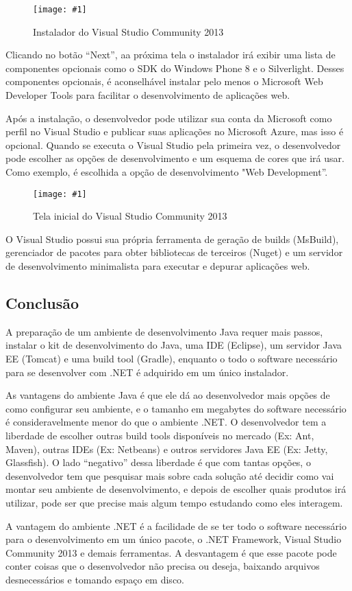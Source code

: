 \documentclass[a4paper,12pt]{article}
\newcommand{\figura}[2] {
	\begin{figure}[ht]
		\centering
		\texttt{[image: \#1]}
		\caption{#2}
	\end{figure}
	\FloatBarrier
}
\begin{document}
\figura{vs1.png}{Instalador do Visual Studio Community 2013}

Clicando no botão “Next”, aa próxima tela o instalador irá exibir uma lista de componentes opcionais como o SDK do Windows Phone 8 e o Silverlight. Desses componentes opcionais, é aconselhável instalar pelo menos o Microsoft Web Developer Tools para facilitar o desenvolvimento de aplicações web.

Após a instalação, o desenvolvedor pode utilizar sua conta da Microsoft como perfil no Visual Studio e publicar suas aplicações no Microsoft Azure, mas isso é opcional. Quando se executa o Visual Studio pela primeira vez, o desenvolvedor pode escolher as opções de desenvolvimento e um esquema de cores que irá usar. Como exemplo, é escolhida a opção de desenvolvimento "Web Development”.

\figura{vs2.png}{Tela inicial do Visual Studio Community 2013}

O Visual Studio possui sua própria ferramenta de geração de builds (MsBuild), gerenciador de pacotes para obter bibliotecas de terceiros (Nuget) e um servidor de desenvolvimento minimalista para executar e depurar aplicações web. 

\subsection{Conclusão}

A preparação de um ambiente de desenvolvimento Java requer mais passos, instalar o kit de desenvolvimento do Java, uma IDE (Eclipse), um servidor Java EE (Tomcat) e uma build tool (Gradle), enquanto o todo o software necessário para se desenvolver com .NET é adquirido em um único instalador.

As vantagens do ambiente Java é que ele dá ao desenvolvedor mais opções de como configurar seu ambiente, e o tamanho em megabytes do software necessário é consideravelmente menor do que o ambiente .NET. O desenvolvedor tem a liberdade de escolher outras build tools disponíveis no mercado (Ex: Ant, Maven), outras IDEs (Ex: Netbeans) e outros servidores Java EE (Ex: Jetty, Glassfish). O lado “negativo” dessa liberdade é que com tantas opções, o desenvolvedor tem que pesquisar mais sobre cada solução até decidir como vai montar seu ambiente de desenvolvimento, e depois de escolher quais produtos irá utilizar, pode ser que precise mais algum tempo estudando como eles interagem.

A vantagem do ambiente .NET é a facilidade de se ter todo o software necessário para o desenvolvimento em um único pacote, o .NET Framework, Visual Studio Community 2013 e demais ferramentas. A desvantagem é que esse pacote pode conter coisas que o desenvolvedor não precisa ou deseja, baixando arquivos desnecessários e tomando espaço em disco.
\end{document}
